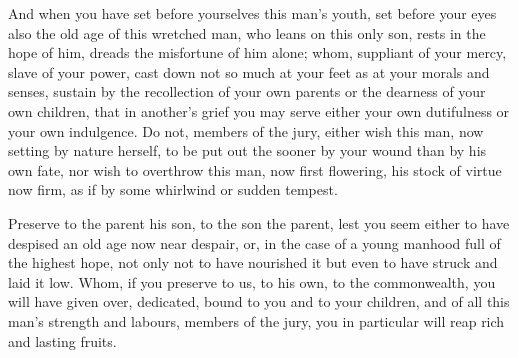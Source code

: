  And when you have set before yourselves this man's youth, set before your eyes also the old age of this wretched man, who leans on this only son, rests in the hope of him, dreads the misfortune of him alone; whom, suppliant of your mercy, slave of your power, cast down not so much at your feet as at your morals and senses, sustain by the recollection of your own parents or the dearness of your own children, that in another's grief you may serve either your own dutifulness or your own indulgence. Do not, members of the jury, either wish this man, now setting by nature herself, to be put out the sooner by your wound than by his own fate, nor wish to overthrow this man, now first flowering, his stock of virtue now firm, as if by some whirlwind or sudden tempest.

 Preserve to the parent his son, to the son the parent, lest you seem either to have despised an old age now near despair, or, in the case of a young manhood full of the highest hope, not only not to have nourished it but even to have struck and laid it low. Whom, if you preserve to us, to his own, to the commonwealth, you will have given over, dedicated, bound to you and to your children, and of all this man's strength and labours, members of the jury, you in particular will reap rich and lasting fruits.
